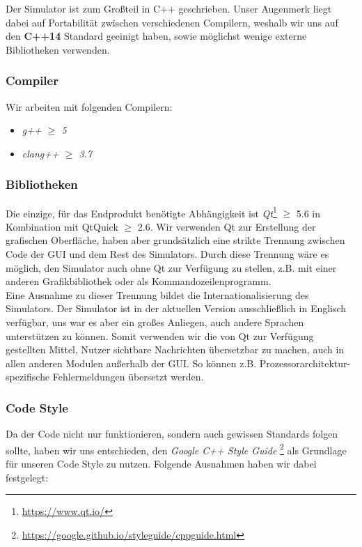Der Simulator ist zum Großteil in C++ geschrieben. Unser Augenmerk liegt dabei auf Portabilität
zwischen verschiedenen Compilern, weshalb wir uns auf den \textbf{C++14} Standard geeinigt haben,
sowie möglichst wenige externe Bibliotheken verwenden.

\subsubsection{Compiler}

Wir arbeiten mit folgenden Compilern:

\begin{itemize}
	\item \textit{g++ $\geq$ 5}
	\item \textit{clang++ $\geq$ 3.7}
\end{itemize}

\subsubsection{Bibliotheken}

Die einzige, für das Endprodukt benötigte Abhängigkeit ist \textit{Qt}\footnote{\url{https://www.qt.io/}}
$\geq$ 5.6 in Kombination mit QtQuick $\geq$ 2.6. Wir verwenden Qt zur Erstellung der grafischen Oberfläche,
haben aber grundsätzlich eine strikte Trennung zwischen Code der GUI und dem Rest des Simulators.
Durch diese Trennung wäre es möglich, den Simulator auch ohne Qt zur Verfügung zu stellen, z.B.
mit einer anderen Grafikbibliothek oder als Kommandozeilenprogramm. \\
Eine Ausnahme zu dieser Trennung bildet die Internationalisierung des Simulators. Der Simulator ist
in der aktuellen Version ausschließlich in Englisch verfügbar, uns war es aber ein großes Anliegen,
auch andere Sprachen unterstützen zu können. Somit verwenden wir die von Qt zur Verfügung gestellten
Mittel, Nutzer sichtbare Nachrichten übersetzbar zu machen, auch in allen anderen Modulen außerhalb
der GUI. So können z.B. Prozessorarchitektur-spezifische Fehlermeldungen übersetzt werden.

\subsubsection{Code Style}

Da der Code nicht nur funktionieren, sondern auch gewissen Standards folgen
sollte, haben wir uns entschieden, den \textit{Google C++ Style Guide}
\footnote{\url{https://google.github.io/styleguide/cppguide.html}} als Grundlage
für unseren Code Style zu nutzen. Folgende Ausnahmen haben wir dabei festgelegt:

